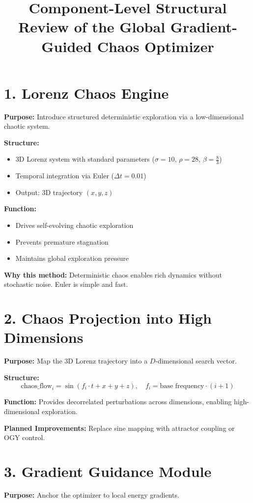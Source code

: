 \documentclass[11pt]{article}
\title{Component-Level Structural Review of the Global Gradient-Guided Chaos Optimizer}
\date{}
\begin{document}
\maketitle

\section*{1. Lorenz Chaos Engine}
\textbf{Purpose:} Introduce structured deterministic exploration via a low-dimensional chaotic system.

\textbf{Structure:}
\begin{itemize}[leftmargin=1.5em]
  \item 3D Lorenz system with standard parameters ($\sigma=10$, $\rho=28$, $\beta=\frac{8}{3}$)
  \item Temporal integration via Euler ($\Delta t = 0.01$)
  \item Output: 3D trajectory $(x, y, z)$
\end{itemize}

\textbf{Function:}
\begin{itemize}[leftmargin=1.5em]
  \item Drives self-evolving chaotic exploration
  \item Prevents premature stagnation
  \item Maintains global exploration pressure
\end{itemize}

\textbf{Why this method:} Deterministic chaos enables rich dynamics without stochastic noise. Euler is simple and fast.

\section*{2. Chaos Projection into High Dimensions}
\textbf{Purpose:} Map the 3D Lorenz trajectory into a $D$-dimensional search vector.

\textbf{Structure:}
\[
\text{chaos\_flow}_i = \sin(f_i \cdot t + x + y + z), \quad f_i = \text{base frequency} \cdot (i+1)
\]

\textbf{Function:} Provides decorrelated perturbations across dimensions, enabling high-dimensional exploration.

\textbf{Planned Improvements:} Replace sine mapping with attractor coupling or OGY control.

\section*{3. Gradient Guidance Module}
\textbf{Purpose:} Anchor the optimizer to local energy gradients.
\end{document}
